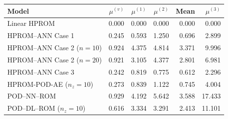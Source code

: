 \begin{tabular}{lrrrrr}
\toprule
Model & $\mu^{(v)}$ & $\mu^{(1)}$ & $\mu^{(2)}$ & Mean & $\mu^{(3)}$ \\
\midrule
Linear HPROM & 0.000 & 0.000 & 0.000 & 0.000 & 0.000 \\
HPROM--ANN Case 1 & 0.245 & 0.593 & 1.250 & 0.696 & 2.899 \\
HPROM--ANN Case 2 ($n=10$) & 0.924 & 4.375 & 4.814 & 3.371 & 9.996 \\
HPROM--ANN Case 2 ($n=20$) & 0.921 & 3.105 & 4.377 & 2.801 & 6.981 \\
HPROM--ANN Case 3 & 0.242 & 0.819 & 0.775 & 0.612 & 2.296 \\
HPROM-POD-AE ($n_z=10$) & 0.273 & 0.839 & 1.122 & 0.745 & 4.004 \\
\midrule
POD--NN--ROM & 0.929 & 4.192 & 5.642 & 3.588 & 17.433 \\
POD--DL--ROM ($n_z=10$) & 0.616 & 3.334 & 3.291 & 2.413 & 11.101 \\
\bottomrule
\end{tabular}

